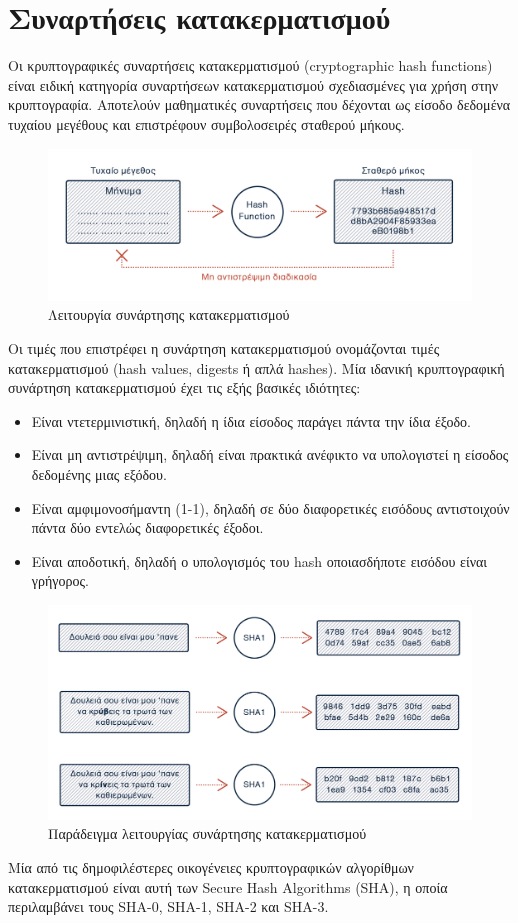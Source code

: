 \section{Συναρτήσεις κατακερματισμού} \label{section:2-1-hash-functions}

Οι κρυπτογραφικές συναρτήσεις κατακερματισμού (cryptographic hash functions) είναι ειδική κατηγορία συναρτήσεων κατακερματισμού σχεδιασμένες για χρήση στην κρυπτογραφία. Αποτελούν μαθηματικές συναρτήσεις που δέχονται ως είσοδο δεδομένα τυχαίου μεγέθους και επιστρέφουν συμβολοσειρές σταθερού μήκους.

\begin{figure}[H]
	\centering
	\includegraphics[width=15cm]{assets/figures/chapter-2/2.1.hash-functions-1.png}
	\caption{Λειτουργία συνάρτησης κατακερματισμού}
\end{figure}

Οι τιμές που επιστρέφει η συνάρτηση κατακερματισμού ονομάζονται τιμές κατακερματισμού (hash values, digests ή απλά hashes). Μία ιδανική κρυπτογραφική συνάρτηση κατακερματισμού έχει τις εξής βασικές ιδιότητες:

\begin{itemize}
	\item Είναι ντετερμινιστική, δηλαδή η ίδια είσοδος παράγει πάντα την ίδια έξοδο.
	\item Είναι μη αντιστρέψιμη, δηλαδή είναι πρακτικά ανέφικτο να υπολογιστεί η είσοδος δεδομένης μιας εξόδου.
	\item Είναι αμφιμονοσήμαντη (1-1), δηλαδή σε δύο διαφορετικές εισόδους αντιστοιχούν πάντα δύο εντελώς διαφορετικές έξοδοι.
	\item Είναι αποδοτική, δηλαδή ο υπολογισμός του hash οποιασδήποτε εισόδου είναι γρήγορος.
\end{itemize}

\begin{figure}[H]
	\centering
	\includegraphics[width=15cm]{assets/figures/chapter-2/2.1.hash-functions-2.png}
	\caption{Παράδειγμα λειτουργίας συνάρτησης κατακερματισμού}
\end{figure}

Μία από τις δημοφιλέστερες οικογένειες κρυπτογραφικών αλγορίθμων κατακερματισμού είναι αυτή των Secure Hash Algorithms (SHA), η οποία περιλαμβάνει τους SHA-0, SHA-1, SHA-2 και SHA-3.
